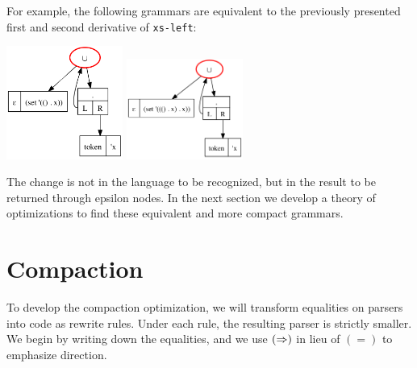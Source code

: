 For example, the following grammars are equivalent to the previously presented
first and second derivative of {\tt xs-left}:
%
\begin{center}
 \includegraphics[width=1.5in]{xs-left-step-1-c.png}
 \includegraphics[width=1.5in]{xs-left-step-2-c.png}
\end{center}
%
The change is not in the language to be recognized, but in the result to be
returned through epsilon nodes.
%
In the next section we develop a theory of optimizations to find these
equivalent and more compact grammars.
  


\section{Compaction}
%
To develop the compaction optimization,
we will transform equalities on parsers into code as rewrite rules.
%
Under each rule, the resulting parser is strictly smaller.
%
We begin by writing down the equalities, and 
we use $(\mathrel{\Rightarrow})$ in lieu of $(=)$ to emphasize direction.

